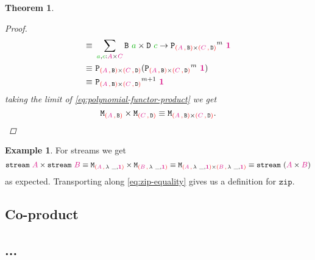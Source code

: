 \documentclass[twoside,11pt,openright]{report}
\theoremstyle{plain} %
\newtheorem{thm}{Theorem}[section]
\theoremstyle{definition}
\newtheorem{exmp}{Example}[section]
\theoremstyle{remark}
\newcommand*{\term}[1]{\textcolor{green!70!black}{#1}} %
\newcommand*{\type}[1]{\textcolor{magenta!90!black}{#1}}
\newcommand*{\containerpair}[2]{\textcolor{red}{(}#1\,\textcolor{red}{,}\,#2\textcolor{red}{)}}
\newcommand*{\unit}{\type{\textbf{1}}}
\newcommand*{\function}[1]{\textcolor{blue!60!black}{\ensuremath{\mathtt{#1}}}}
\newcommand*{\typeformer}[1]{\ensuremath{\mathtt{#1}}}
\newcommand*{\functor}[1]{\ensuremath{\mathbf{\mathtt{#1}}}}
\begin{document}
\begin{thm}
\begin{proof}
\begin{align}
      \equiv&~ \sum_{\term{a} , \term{c} : \type{A} \times \type{C}} \typeformer{B}~\term{a} \times \typeformer{D}~\term{c} \rightarrow {\functor{P}_{\containerpair{\type{A}}{\typeformer{B}} \times \containerpair{\type{C}}{\typeformer{D}}}}^m~\unit \\
      \equiv&~ \functor{P}_{\containerpair{\type{A}}{\typeformer{B}} \times \containerpair{\type{C}}{\typeformer{D}}} ({\functor{P}_{\containerpair{\type{A}}{\typeformer{B}} \times \containerpair{\type{C}}{\typeformer{D}}}}^m~\unit) \\
      \equiv&~ {\functor{P}_{\containerpair{\type{A}}{\typeformer{B}} \times \containerpair{\type{C}}{\typeformer{D}}}}^{m+1}~\unit
    \end{align}
    taking the limit of \eqref{eq:polynomial-functor-product} we get
  \begin{equation}
    \typeformer{M}_{\containerpair{\type{A}}{\typeformer{B}}} \times \typeformer{M}_{\containerpair{\type{C}}{\typeformer{D}}} \equiv \typeformer{M}_{\containerpair{\type{A}}{\typeformer{B}} \times \containerpair{\type{C}}{\typeformer{D}}}.
  \end{equation}
  \end{proof}
\end{thm}
\begin{exmp} For streams we get
\begin{equation}
  \typeformer{stream}~\type{A} \times \typeformer{stream}~\type{B} \equiv \typeformer{M}_{\containerpair{\type{A}}{\lambda~\_,\unit}} \times \typeformer{M}_{\containerpair{\type{B}}{\lambda~\_,\unit}} \equiv \typeformer{M}_{\containerpair{\type{A}}{\lambda~\_,\unit} \times \containerpair{\type{B}}{\lambda~\_,\unit}} \equiv \typeformer{stream}~(\type{A} \times \type{B}) \label{eq:zip-equality}
\end{equation}
as expected. Transporting along \eqref{eq:zip-equality} gives us a definition for \function{zip}.
\end{exmp}

\subsection{Co-product}

\subsection{...}
\end{document}
